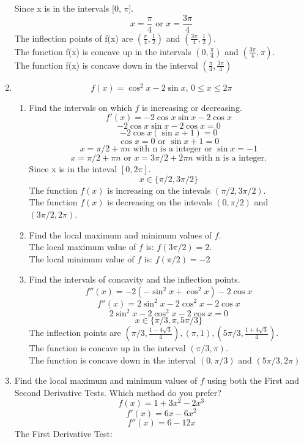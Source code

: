 \documentclass[12pt]{article}
\begin{document}
\begin{enumerate}
        Since x is in the intervals [0, $\pi$].
        \[x = \frac{\pi}{4} \text{ or } x = \frac{3\pi}{4}\]
        The inflection points of f(x) are $(\frac{\pi}{4}, \frac{1}{2})$ and $(\frac{3\pi}{4}, \frac{1}{2})$.\\
        The function f(x) is concave up in the intervals $(0,\frac{\pi}{4})$ and $(\frac{3\pi}{4},\pi)$.\\
        The function f(x) is concave down in the interval $(\frac{\pi}{4}, \frac{3\pi}{4})$
        \setcounter{enumi}{21}
    \item \[f(x) = \cos^2x - 2\sin x \text{, } 0 \leq x \leq 2\pi\]
        \begin{enumerate}
            \item Find the intervals on which $f$ is increasing or decreasing.
                \[f'(x) = -2\cos x \sin x - 2\cos x\]
                \[-2\cos x \sin x - 2\cos x = 0\]
                \[-2\cos x(\sin x + 1) = 0\]
                \[\cos x = 0 \text{ or } \sin x + 1 = 0\]
                \[ x = \pi/2 + \pi n \text{ with n is a integer or } \sin x = -1\]
                \[ x = \pi/2 + \pi n \text{ or } x = 3\pi/2 + 2\pi n \text{ with n is a integer.}\]
                Since x is in the inteval $[0,2\pi]$.
                \[x \in \{\pi/2,3\pi/2\}\]
                The function $f(x)$ is increasing on the intevals $(\pi/2,3\pi/2)$.\\
                The function $f(x)$ is decreasing on the intevals $(0,\pi/2)$ and $(3\pi/2,2\pi)$.
            \item Find the local maximum and minimum values of $f$.\\
                The local maximum value of $f$ is: $f(3\pi/2) = 2$.\\
                The local minimum value of $f$ is: $f(\pi/2) = -2$
            \item Find the intervals of concavity and the inflection points.
                \[f''(x) = -2(-\sin^2 x + \cos^2 x) - 2\cos x\]
                \[f''(x) = 2\sin^2 x -2\cos^2 x - 2\cos x\]
                \[2\sin^2 x -2\cos^2 x - 2\cos x = 0\]
                \[x \in \{\pi/3,\pi,5\pi/3\}\]
                The inflection points are $(\pi/3, \frac{1-4\sqrt{3}}{4}), (\pi,1), (5\pi/3, \frac{1+4\sqrt{3}}{4})$.\\
                The function is concave up in the interval $(\pi/3,\pi)$.\\
                The function is concave down in the interval $(0,\pi/3)$ and $(5\pi/3,2\pi)$
        \end{enumerate}
        \item Find the local maximum and minimum values of $f$ using both the First and Second Derivative Tests. Which method do you prefer?
            \[f(x) = 1 + 3x^2 - 2x^3\]
            \[f'(x) = 6x - 6x^2\]
            \[f''(x) = 6 - 12x\]
        The First Derivative Test:

\end{enumerate}
\end{document}
